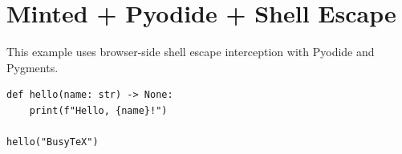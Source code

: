 \documentclass{article}
\begin{document}
\section*{Minted + Pyodide + Shell Escape}

This example uses browser-side shell escape interception with Pyodide and Pygments.

\begin{verbatim}
def hello(name: str) -> None:
    print(f"Hello, {name}!")

hello("BusyTeX")
\end{verbatim}
\end{document}
